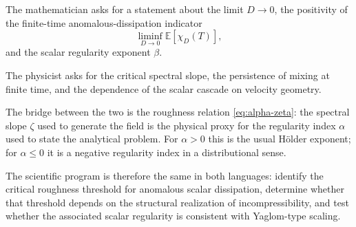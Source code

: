 \documentclass[11pt]{article}
\newcommand{\E}{\mathbb{E}}
\begin{document}
The mathematician asks for a statement about the limit $D\to 0$, the positivity
of the finite-time anomalous-dissipation indicator
\[
\liminf_{D\to 0}\E[\chi_D(T)],
\]
and the scalar regularity exponent $\beta$.

The physicist asks for the critical spectral slope, the persistence of mixing at
finite time, and the dependence of the scalar cascade on velocity geometry.

The bridge between the two is the roughness relation \eqref{eq:alpha-zeta}: the
spectral slope $\zeta$ used to generate the field is the physical proxy for the
regularity index $\alpha$ used to state the analytical problem. For $\alpha>0$
this is the usual H\"older exponent; for $\alpha\le 0$ it is a negative
regularity index in a distributional sense.

The scientific program is therefore the same in both languages: identify the critical roughness threshold for anomalous scalar dissipation, determine whether that threshold depends on the structural realization of incompressibility, and test whether the associated scalar regularity is consistent with Yaglom-type scaling.
\end{document}
